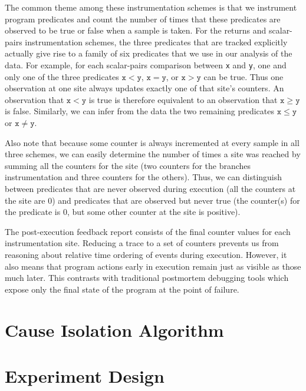 \documentclass[draft]{sig-alternate}
\begin{document}
The common theme among these instrumentation schemes is that we
instrument program predicates and count the number of times that these
predicates are observed to be true or false when a sample is taken.
For the returns and scalar-pairs instrumentation schemes, the three
predicates that are tracked explicitly actually give rise to a family
of six predicates that we use in our analysis of the data.
For example, for each scalar-pairs comparison between \texttt{x} and \texttt{y}, one and
only one of the three predicates $\mathtt{x} < \mathtt{y}$, $\mathtt{x} = \mathtt{y}$, or
$\mathtt{x} > \mathtt{y}$ can be true.  Thus one observation at one
site always updates exactly one of that site's counters.  An
observation that $\mathtt{x} < \mathtt{y}$ is true is therefore equivalent to
an observation that $\mathtt{x} \geq \mathtt{y}$ is false.  Similarly, we can
infer from the data the two remaining predicates $\mathtt{x} \leq \mathtt{y}$ or
$\mathtt{x} \neq \mathtt{y}$.

Also note that because some counter is always incremented at every
sample in all three schemes, we can easily determine the number of
times a site was reached by summing all the counters for the site
(two counters for the branches instrumentation and three counters for
the others).  Thus, we can distinguish between predicates that are
never observed during execution (all the counters at the site are 0)
and predicates that are observed but never true (the counter(s) for the predicate
is 0, but some other counter at the site is positive).

The post-execution feedback report consists of the final counter values for
each instrumentation site.  Reducing a trace to a set of counters
prevents us from reasoning about relative time ordering of events
during execution.  However, it also means that program actions early
in execution remain just as visible as those much later.  This
contrasts with traditional postmortem debugging tools which expose
only the final state of the program at the point of failure.

\section{Cause Isolation Algorithm}
\label{sec:algorithm}


\section{Experiment Design}
\label{sec:experiments:setup}

\end{document}
